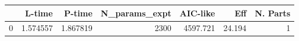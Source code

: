 \begin{tabular}{lrrrrrr}
\toprule
{} &    L-time &    P-time &  N\_params\_expt &  AIC-like &     Eff &  N. Parts \\
\midrule
0 &  1.574557 &  1.867819 &           2300 &  4597.721 &  24.194 &         1 \\
\bottomrule
\end{tabular}
